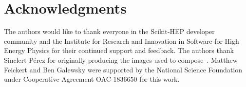 \section{Acknowledgments}\label{sec:acknowledgements}

The authors would like to thank everyone in the Scikit-HEP developer community and the Institute for Research and Innovation in Software for High Energy Physics for their continued support and feedback.
The authors thank Sinclert P{\'e}rez for originally producing the images used to compose~.
Matthew Feickert and Ben Galewsky were supported by the National Science Foundation under Cooperative Agreement OAC-1836650 for this work.
